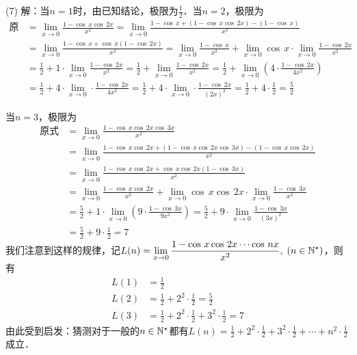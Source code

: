 \noindent (7) 解：当$n=1$时，由已知结论，极限为$\displaystyle\frac{1}{2}$．当$n=2$，极限为
\begin{align}
\text{原式} &= \lim_{x \to 0} \displaystyle\frac{1-\cos \, x \cos \, 2x}{x^2} = \lim_{x \to 0} \frac{1 - \cos \, x + (1 - \cos \, x \cos \, 2x) - (1 - \cos \, x)}{x^2} \\
&= \lim_{x \to 0} \frac{1 - \cos \, x + \cos \, x (1 - \cos \, 2x)}{x^2} = \lim_{x \to 0} \frac{1 - \cos \, x}{x^2} + \lim_{x \to 0} \cos \, x \cdot \lim_{x \to 0} \frac{1-\cos \, 2x}{x^2} \\
&= \frac{1}{2} + 1 \cdot \lim_{x \to 0} \frac{1-\cos \, 2x}{x^2} = \frac{1}{2} + \lim_{x \to 0} \frac{1-\cos \, 2x}{x^2} = \frac{1}{2} + \lim_{x \to 0} \left( 4 \cdot \frac{1-\cos \, 2x}{4x^2} \right) \\
&= \frac{1}{2} + 4 \cdot \lim_{x \to 0} \cdot \frac{1-\cos \, 2x}{4x^2} = \frac{1}{2} + 4 \cdot \lim_{x \to 0} \cdot \frac{1-\cos \, 2x}{(2x)^2} = \frac{1}{2} + 4 \cdot \frac{1}{2} = \frac{5}{2}
\end{align}

\noindent 当$n=3$，极限为
\begin{align}
    \text{原式} &= \lim_{x \to 0} \frac{1-\cos \, x \cos \, 2x \cos \, 3x}{x^2} \\
    &= \lim_{x \to 0} \frac{1-\cos \, x \cos \, 2x + (1-\cos \, x \cos \, 2x \cos \, 3x) - (1-\cos \, x \cos \, 2x)}{x^2} \\
    &= \lim_{x \to 0} \frac{1-\cos \, x \cos \, 2x + \cos \, x \cos \, 2x(1-\cos \, 3x)}{x^2} \\
    &= \lim_{x \to 0} \frac{1-\cos \, x \cos \, 2x}{x^2} + \lim_{x \to 0} \cos \, x \cos \, 2x \cdot \lim_{x \to 0} \frac{1-\cos \, 3x}{x^2} \\
    &= \frac{5}{2} + 1 \cdot \lim_{x \to 0} \left( 9 \cdot \frac{1-\cos \, 3x}{9 x^2} \right) = \frac{5}{2} + 9 \cdot \lim_{x \to 0} \frac{1-\cos \, 3x}{(3x)^2} \\
    &= \frac{5}{2} + 9 \cdot \frac{1}{2} = 7
\end{align}
我们注意到这样的规律，记$L(n) = \displaystyle\lim_{x \to 0} \displaystyle\frac{1-\cos \, x \cos \, 2x \cdots \cos \, nx}{x^2}, \; (n \in \mathbb{N}^\star)$，则有
\begin{align}
L(1) &= \frac{1}{2} \\
L(2) &= \frac{1}{2} + 2^2 \cdot \frac{1}{2} = \frac{5}{2} \\
L(3) &= \frac{1}{2} + 2^2 \cdot \frac{1}{2} + 3^2 \cdot \frac{1}{2} = 7
\end{align}
由此受到启发：猜测对于一般的$n \in \mathbb{N}^\star$都有$L(n) = \displaystyle\frac{1}{2} + 2^2 \cdot \displaystyle\frac{1}{2} + 3^2 \cdot \displaystyle\frac{1}{2} + \cdots + n^2 \cdot \displaystyle\frac{1}{2}$成立．

